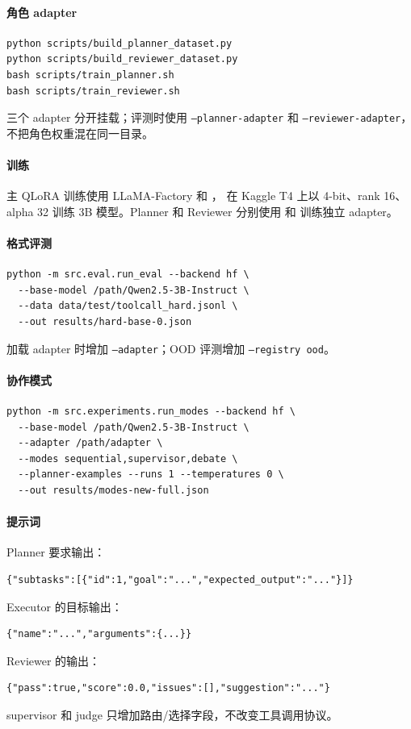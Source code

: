 \documentclass[UTF8,a4paper,12pt]{ctexart}
\begin{document}
\paragraph{角色 adapter}
\begin{verbatim}
python scripts/build_planner_dataset.py
python scripts/build_reviewer_dataset.py
bash scripts/train_planner.sh
bash scripts/train_reviewer.sh
\end{verbatim}
三个 adapter 分开挂载；评测时使用 \texttt{--planner-adapter} 和
\texttt{--reviewer-adapter}，不把角色权重混在同一目录。

\paragraph{训练}
主 QLoRA 训练使用 LLaMA-Factory 和 ，
在 Kaggle T4 上以 4-bit、rank 16、alpha 32 训练 3B 模型。Planner 和
Reviewer 分别使用  和
 训练独立 adapter。

\paragraph{格式评测}
\begin{verbatim}
python -m src.eval.run_eval --backend hf \
  --base-model /path/Qwen2.5-3B-Instruct \
  --data data/test/toolcall_hard.jsonl \
  --out results/hard-base-0.json
\end{verbatim}
加载 adapter 时增加 \texttt{--adapter}；OOD 评测增加
\texttt{--registry ood}。

\paragraph{协作模式}
\begin{verbatim}
python -m src.experiments.run_modes --backend hf \
  --base-model /path/Qwen2.5-3B-Instruct \
  --adapter /path/adapter \
  --modes sequential,supervisor,debate \
  --planner-examples --runs 1 --temperatures 0 \
  --out results/modes-new-full.json
\end{verbatim}

\paragraph{提示词}
Planner 要求输出：
\begin{verbatim}
{"subtasks":[{"id":1,"goal":"...","expected_output":"..."}]}
\end{verbatim}
Executor 的目标输出：
\begin{verbatim}
{"name":"...","arguments":{...}}
\end{verbatim}
Reviewer 的输出：
\begin{verbatim}
{"pass":true,"score":0.0,"issues":[],"suggestion":"..."}
\end{verbatim}
supervisor 和 judge 只增加路由/选择字段，不改变工具调用协议。
\end{document}
